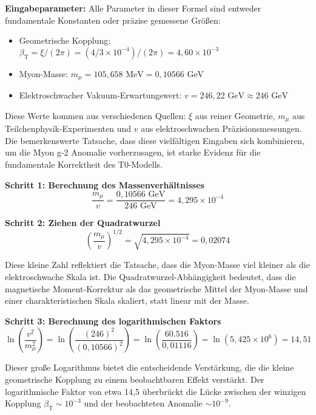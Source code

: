 \documentclass[12pt,a4paper]{article}
\newcommand{\betaT}{\beta_{\text{T}}}
\newcommand{\xipar}{\xi}
\begin{document}
	\textbf{Eingabeparameter:}
	Alle Parameter in dieser Formel sind entweder fundamentale Konstanten oder präzise gemessene Größen:
	\begin{itemize}
		\item Geometrische Kopplung: $\betaT = \xipar/(2\pi) = (4/3 \times 10^{-4})/(2\pi) = 4{,}60 \times 10^{-3}$
		\item Myon-Masse: $m_{\mu} = 105{,}658 \text{ MeV} = 0{,}10566 \text{ GeV}$
		\item Elektroschwacher Vakuum-Erwartungswert: $v = 246{,}22 \text{ GeV} \approx 246 \text{ GeV}$
	\end{itemize}
	
	Diese Werte kommen aus verschiedenen Quellen: $\xipar$ aus reiner Geometrie, $m_{\mu}$ aus Teilchenphysik-Experimenten und $v$ aus elektroschwachen Präzisionsmessungen. Die bemerkenswerte Tatsache, dass diese vielfältigen Eingaben sich kombinieren, um die Myon g-2 Anomalie vorherzusagen, ist starke Evidenz für die fundamentale Korrektheit des T0-Modells.
	
	\textbf{Schritt 1: Berechnung des Massenverhältnisses}
	\begin{equation}
		\frac{m_{\mu}}{v} = \frac{0{,}10566 \text{ GeV}}{246 \text{ GeV}} = 4{,}295 \times 10^{-4}
	\end{equation}
	
	\textbf{Schritt 2: Ziehen der Quadratwurzel}
	\begin{equation}
		\left(\frac{m_{\mu}}{v}\right)^{1/2} = \sqrt{4{,}295 \times 10^{-4}} = 0{,}02074
	\end{equation}
	
	Diese kleine Zahl reflektiert die Tatsache, dass die Myon-Masse viel kleiner als die elektroschwache Skala ist. Die Quadratwurzel-Abhängigkeit bedeutet, dass die magnetische Moment-Korrektur als das geometrische Mittel der Myon-Masse und einer charakteristischen Skala skaliert, statt linear mit der Masse.
	
	\textbf{Schritt 3: Berechnung des logarithmischen Faktors}
	\begin{equation}
		\ln\left(\frac{v^2}{m_{\mu}^2}\right) = \ln\left(\frac{(246)^2}{(0{,}10566)^2}\right) = \ln\left(\frac{60.516}{0{,}01116}\right) = \ln(5{,}425 \times 10^6) = 14{,}51
	\end{equation}
	
	Dieser große Logarithmus bietet die entscheidende Verstärkung, die die kleine geometrische Kopplung zu einem beobachtbaren Effekt verstärkt. Der logarithmische Faktor von etwa 14{,}5 überbrückt die Lücke zwischen der winzigen Kopplung $\betaT \sim 10^{-3}$ und der beobachteten Anomalie $\sim 10^{-9}$.
	
\end{document}
